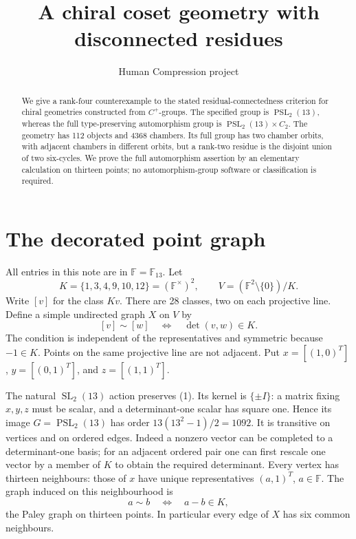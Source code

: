 \documentclass[11pt,a4paper]{article}
\title{A chiral coset geometry with disconnected residues}
\author{Human Compression project}
\date{}
\newcommand{\F}{\mathbb F}
\begin{document}
\maketitle
\begin{abstract}
We give a rank-four counterexample to the stated residual-connectedness
criterion for chiral geometries constructed from $C^+$-groups. The
specified group is $\operatorname{PSL}_2(13)$, whereas the full
type-preserving automorphism group is
$\operatorname{PSL}_2(13)\times C_2$. The geometry has 112 objects and
4368 chambers. Its full group has two chamber orbits, with adjacent
chambers in different orbits, but a rank-two residue is the disjoint
union of two six-cycles. We prove the full automorphism assertion by
an elementary calculation on thirteen points; no automorphism-group
software or classification is required.
\end{abstract}

\section{The decorated point graph}
All entries in this note are in $\F=\F_{13}$. Let
\[
 K=\{1,3,4,9,10,12\}=(\F^\times)^2,
 \qquad V=(\F^2\setminus\{0\})/K.
\]
Write $[v]$ for the class $Kv$. There are 28 classes, two on each
projective line. Define a simple undirected graph $X$ on $V$ by
\[
                  [v]\sim[w]\quad\Longleftrightarrow\quad
                  \det(v,w)\in K.                         \tag{1}
\]
The condition is independent of the representatives and symmetric
because $-1\in K$. Points on the same projective line are not adjacent.
Put $x=[(1,0)^T]$, $y=[(0,1)^T]$, and $z=[(1,1)^T]$.

The natural $\operatorname{SL}_2(13)$ action preserves (1). Its kernel
is $\{\pm I\}$: a matrix fixing $x,y,z$ must be scalar, and a
determinant-one scalar has square one. Hence its image
$G=\operatorname{PSL}_2(13)$ has order $13(13^2-1)/2=1092$.
It is transitive on vertices and on ordered edges. Indeed a nonzero
vector can be completed to a determinant-one basis; for an adjacent
ordered pair one can first rescale one vector by a member of $K$ to
obtain the required determinant. Every vertex has thirteen neighbours:
those of $x$ have unique representatives $(a,1)^T$, $a\in\F$.
The graph induced on this neighbourhood is
\[
          a\sim b\quad\Longleftrightarrow\quad a-b\in K,
                                                        \tag{2}
\]
the Paley graph on thirteen points. In particular every edge of $X$
has six common neighbours.
\end{document}
